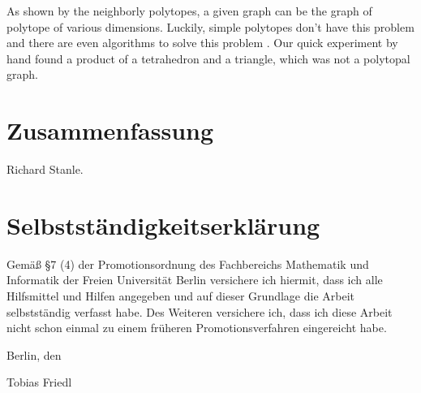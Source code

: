 \documentclass[a4paper,12pt]{book}
\theoremstyle{plain}
\theoremstyle{definition}
\begin{document}
 As shown by the neighborly polytopes, a given graph can be the graph of polytope of various dimensions. 
Luckily, simple polytopes don't have this problem and there are even algorithms to solve this problem \cite{KALAI1988381} \cite{Achatz2000}. 
Our quick experiment by hand found a product of a tetrahedron and a triangle, which was not a polytopal graph.




\cleardoublepage
{}
{}






\chapter*{Zusammenfassung}

\small{
Richard Stanle.}




\chapter*{Selbstst\"andigkeitserkl\"arung}

Gem\"a{\ss} \S 7 (4) der Promotionsordnung des Fachbereichs Mathematik und Informatik der Freien Universit\"at Berlin versichere ich hiermit, dass ich alle Hilfsmittel und Hilfen angegeben und auf dieser Grundlage die Arbeit selbstst\"andig verfasst habe. Des Weiteren versichere ich, dass ich diese Arbeit nicht schon einmal zu einem fr\"uheren Promotionsverfahren eingereicht habe.

\vspace{0.8cm}
\noindent Berlin, den 

\vspace{1.6cm}
\noindent Tobias Friedl
\end{document}
